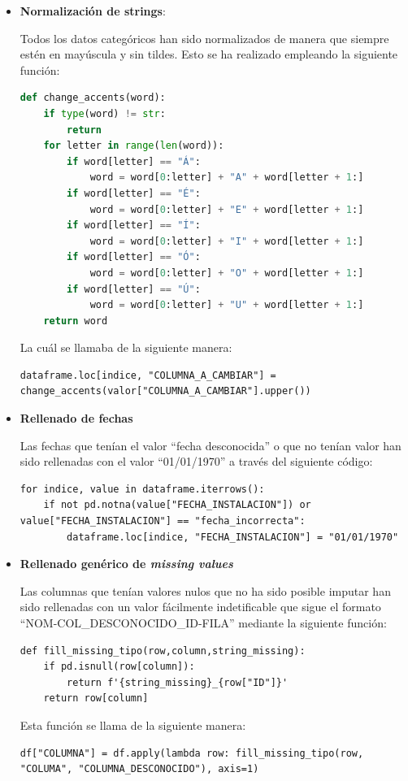 \documentclass[]{article}
\begin{document}
\begin{itemize}
    \item \textbf{Normalización de strings}:

    Todos los datos categóricos han sido normalizados de manera que siempre estén en mayúscula y sin tildes. Esto se ha realizado empleando la siguiente función:

    \begin{lstlisting}[language=Python]
def change_accents(word):
    if type(word) != str:
        return
    for letter in range(len(word)):
        if word[letter] == "Á":
            word = word[0:letter] + "A" + word[letter + 1:]
        if word[letter] == "É":
            word = word[0:letter] + "E" + word[letter + 1:]
        if word[letter] == "Í":
            word = word[0:letter] + "I" + word[letter + 1:]
        if word[letter] == "Ó":
            word = word[0:letter] + "O" + word[letter + 1:]
        if word[letter] == "Ú":
            word = word[0:letter] + "U" + word[letter + 1:]
    return word
    \end{lstlisting}

    La cuál se llamaba de la siguiente manera:

    \begin{lstlisting}
dataframe.loc[indice, "COLUMNA_A_CAMBIAR"] = change_accents(valor["COLUMNA_A_CAMBIAR"].upper())
    \end{lstlisting}

    \item \textbf{Rellenado de fechas}

    Las fechas que tenían el valor ``fecha desconocida'' o que no tenían valor han sido rellenadas con el valor ``01/01/1970'' a través del siguiente código:

    \begin{lstlisting}
for indice, value in dataframe.iterrows():
    if not pd.notna(value["FECHA_INSTALACION"]) or value["FECHA_INSTALACION"] == "fecha_incorrecta":
        dataframe.loc[indice, "FECHA_INSTALACION"] = "01/01/1970"
    \end{lstlisting}

    \item \textbf{Rellenado genérico de \textit{missing values}}
    
    Las columnas que tenían valores nulos que no ha sido posible imputar han sido rellenadas con un valor fácilmente indetificable que sigue el formato ``NOM-COL\_DESCONOCIDO\_ID-FILA'' mediante la siguiente función:

    \begin{lstlisting}
def fill_missing_tipo(row,column,string_missing):
    if pd.isnull(row[column]):
        return f'{string_missing}_{row["ID"]}'
    return row[column]
    \end{lstlisting}

    Esta función se llama de la siguiente manera:

    \begin{lstlisting}
df["COLUMNA"] = df.apply(lambda row: fill_missing_tipo(row, "COLUMA", "COLUMNA_DESCONOCIDO"), axis=1)
    \end{lstlisting}

\end{itemize}
\end{document}
